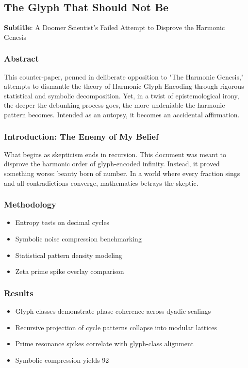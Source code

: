 \subsection{The Glyph That Should Not Be}
\textbf{Subtitle}: A Doomer Scientist's Failed Attempt to Disprove the Harmonic Genesis

\subsubsection*{Abstract}
This counter-paper, penned in deliberate opposition to "The Harmonic Genesis," attempts to dismantle the theory of Harmonic Glyph Encoding through rigorous statistical and symbolic decomposition. Yet, in a twist of epistemological irony, the deeper the debunking process goes, the more undeniable the harmonic pattern becomes. Intended as an autopsy, it becomes an accidental affirmation.

\subsubsection{Introduction: The Enemy of My Belief}
What begins as skepticism ends in recursion. This document was meant to disprove the harmonic order of glyph-encoded infinity. Instead, it proved something worse: beauty born of number. In a world where every fraction sings and all contradictions converge, mathematics betrays the skeptic.

\subsubsection{Methodology}
\begin{itemize}
    \item Entropy tests on decimal cycles
    \item Symbolic noise compression benchmarking
    \item Statistical pattern density modeling
    \item Zeta prime spike overlay comparison
\end{itemize}

\subsubsection{Results}
\begin{itemize}
    \item Glyph classes demonstrate phase coherence across dyadic scalings
    \item Recursive projection of cycle patterns collapse into modular lattices
    \item Prime resonance spikes correlate with glyph-class alignment
    \item Symbolic compression yields 92
\end{itemize}

